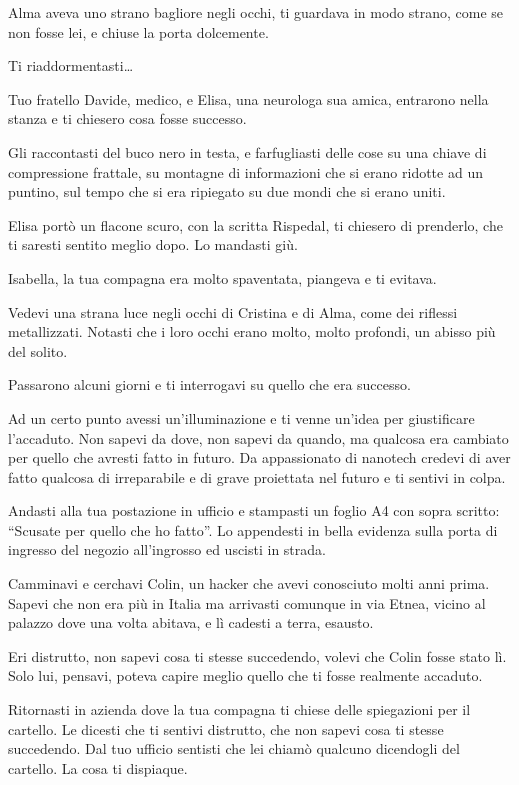 Alma aveva uno strano bagliore negli occhi, ti guardava in modo strano, come se non fosse lei, e chiuse la porta dolcemente.

Ti riaddormentasti\ldots

Tuo fratello Davide, medico, e Elisa, una neurologa sua amica, entrarono nella stanza e ti chiesero cosa fosse successo.

Gli raccontasti del buco nero in testa, e farfugliasti delle cose su una chiave di compressione frattale, su montagne di informazioni che si erano ridotte ad un puntino, sul tempo che si era ripiegato su due mondi che si erano uniti.

Elisa portò un flacone scuro, con la scritta Rispedal, ti chiesero di prenderlo, che ti saresti sentito meglio dopo. Lo mandasti giù.

Isabella, la tua compagna era molto spaventata, piangeva e ti evitava.

Vedevi una strana luce negli occhi di Cristina e di Alma, come dei riflessi metallizzati. Notasti che i loro occhi erano molto, molto profondi, un abisso più del solito.

Passarono alcuni giorni e ti interrogavi su quello che era successo.

Ad un certo punto avessi un'illuminazione e ti venne un'idea per giustificare l'accaduto. Non sapevi da dove, non sapevi da quando, ma qualcosa era cambiato per quello che avresti fatto in futuro. Da appassionato di nanotech credevi di aver fatto qualcosa di irreparabile e di grave proiettata nel futuro e ti sentivi in colpa.

Andasti alla tua postazione in ufficio e stampasti un foglio A4 con sopra scritto: “Scusate per quello che ho fatto”. Lo appendesti in bella evidenza sulla porta di ingresso del negozio all'ingrosso ed uscisti in strada.

Camminavi e cerchavi Colin, un hacker che avevi conosciuto molti anni prima. Sapevi che non era più in Italia ma arrivasti comunque in via Etnea, vicino al palazzo dove una volta abitava, e lì cadesti a terra, esausto.

Eri distrutto, non sapevi cosa ti stesse succedendo, volevi che Colin fosse stato lì. Solo lui, pensavi, poteva capire meglio quello che ti fosse realmente accaduto.

Ritornasti in azienda dove la tua compagna ti chiese delle spiegazioni per il cartello. Le dicesti che ti sentivi distrutto, che non sapevi cosa ti stesse succedendo. Dal tuo ufficio sentisti che lei chiamò qualcuno dicendogli del cartello. La cosa ti dispiaque.


